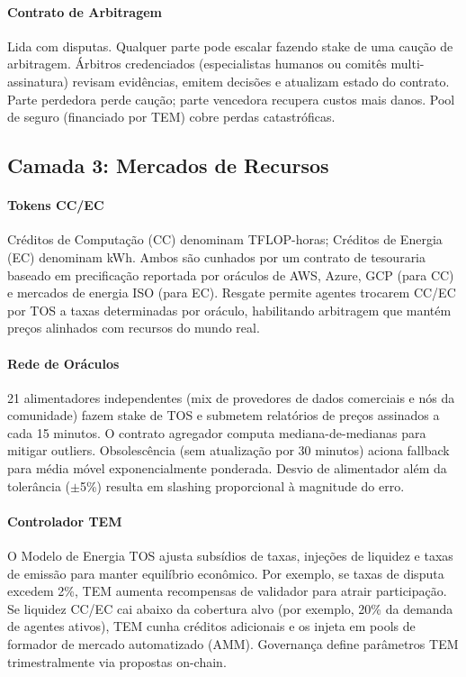 \documentclass[11pt]{article}
\begin{document}
\paragraph{Contrato de Arbitragem} Lida com disputas. Qualquer parte pode escalar fazendo stake de uma caução de arbitragem. Árbitros credenciados (especialistas humanos ou comitês multi-assinatura) revisam evidências, emitem decisões e atualizam estado do contrato. Parte perdedora perde caução; parte vencedora recupera custos mais danos. Pool de seguro (financiado por TEM) cobre perdas catastróficas.

\subsection{Camada 3: Mercados de Recursos}
\paragraph{Tokens CC/EC} Créditos de Computação (CC) denominam TFLOP-horas; Créditos de Energia (EC) denominam kWh. Ambos são cunhados por um contrato de tesouraria baseado em precificação reportada por oráculos de AWS, Azure, GCP (para CC) e mercados de energia ISO (para EC). Resgate permite agentes trocarem CC/EC por TOS a taxas determinadas por oráculo, habilitando arbitragem que mantém preços alinhados com recursos do mundo real.

\paragraph{Rede de Oráculos} 21 alimentadores independentes (mix de provedores de dados comerciais e nós da comunidade) fazem stake de TOS e submetem relatórios de preços assinados a cada 15 minutos. O contrato agregador computa mediana-de-medianas para mitigar outliers. Obsolescência (sem atualização por 30 minutos) aciona fallback para média móvel exponencialmente ponderada. Desvio de alimentador além da tolerância ($\pm$5\%) resulta em slashing proporcional à magnitude do erro.

\paragraph{Controlador TEM} O Modelo de Energia TOS ajusta subsídios de taxas, injeções de liquidez e taxas de emissão para manter equilíbrio econômico. Por exemplo, se taxas de disputa excedem 2\%, TEM aumenta recompensas de validador para atrair participação. Se liquidez CC/EC cai abaixo da cobertura alvo (por exemplo, 20\% da demanda de agentes ativos), TEM cunha créditos adicionais e os injeta em pools de formador de mercado automatizado (AMM). Governança define parâmetros TEM trimestralmente via propostas on-chain.
\end{document}
